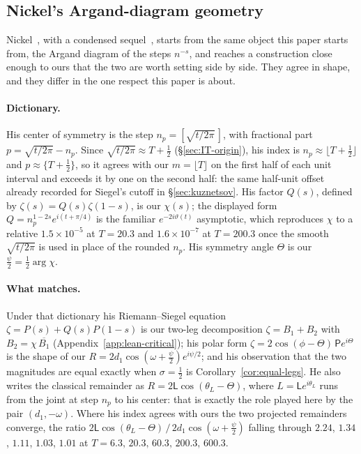\documentclass[11pt]{article}
\theoremstyle{definition}
\begin{document}
\subsection{Nickel's Argand-diagram geometry}\label{sec:nickel}

Nickel~\cite{Nickel2013}, with a condensed sequel~\cite{Nickel2015}, starts
from the same object this paper starts from,
the Argand diagram of the steps $n^{-s}$, and reaches a construction close
enough to ours that the two are worth setting side by side. They agree in
shape, and they differ in the one respect this paper is about.

\paragraph{Dictionary.} His center of symmetry is the step
$n_p=[\sqrt{t/2\pi}\,]$, with fractional part $p=\sqrt{t/2\pi}-n_p$. Since
$\sqrt{t/2\pi}\approx T+\tfrac12$ (\S\ref{sec:IT-origin}), his index is
$n_p\approx\lfloor T+\tfrac12\rfloor$ and $p\approx\{T+\tfrac12\}$, so it
agrees with our $m=\lfloor T\rfloor$ on the first half of each unit interval
and exceeds it by one on the second half: the same half-unit offset already
recorded for Siegel's cutoff in \S\ref{sec:kuznetsov}. His factor $Q(s)$,
defined by $\zeta(s)=Q(s)\zeta(1-s)$, is our $\chi(s)$; the displayed form
$Q=n_p^{1-2s}e^{i(t+\pi/4)}$ is the familiar $e^{-2i\vartheta(t)}$ asymptotic,
which reproduces $\chi$ to a relative $1.5\times10^{-5}$ at $T=20.3$ and
$1.6\times10^{-7}$ at $T=200.3$ once the smooth $\sqrt{t/2\pi}$ is used in
place of the rounded $n_p$. His symmetry angle $\Theta$ is our
$\tfrac{\psi}{2}=\tfrac12\arg\chi$.

\paragraph{What matches.} Under that dictionary his Riemann--Siegel equation
$\zeta=P(s)+Q(s)P(1-s)$ is our two-leg decomposition $\zeta=B_1+B_2$ with
$B_2=\chi\,\overline{B_1}$ (Appendix~\ref{app:lean-critical}); his polar form
$\zeta=2\cos(\phi-\Theta)\,\mathsf{P}e^{i\Theta}$ is the shape of our
$R=2d_1\cos(\omega+\tfrac{\psi}{2})e^{i\psi/2}$; and his observation that the
two magnitudes are equal exactly when $\sigma=\tfrac12$ is
Corollary~\ref{cor:equal-legs}. He also writes the classical remainder as
$R=2\mathsf{L}\cos(\theta_L-\Theta)$, where $L=\mathsf{L}e^{i\theta_L}$ runs
from the joint at step $n_p$ to his center: that is exactly the role played
here by the pair $(d_1,-\omega)$. Where his index agrees with ours the two
projected remainders converge, the ratio
$2\mathsf{L}\cos(\theta_L-\Theta)\,/\,2d_1\cos(\omega+\tfrac{\psi}{2})$
falling through $2.24$, $1.34$, $1.11$, $1.03$, $1.01$ at
$T=6.3,\,20.3,\,60.3,\,200.3,\,600.3$.
\end{document}
